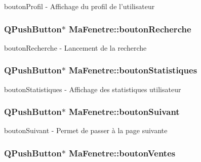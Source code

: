 bouton\-Profil -\/ Affichage du profil de l'utilisateur 

\hypertarget{class_ma_fenetre_afe6e47d40e487fccd18d4bcc3c57e64e}{
\subsubsection[{bouton\-Recherche}]{\setlength{\rightskip}{0pt plus 5cm}Q\-Push\-Button$\ast$ Ma\-Fenetre\-::bouton\-Recherche\hspace{0.3cm}{\ttfamily [protected]}}}\label{class_ma_fenetre_afe6e47d40e487fccd18d4bcc3c57e64e}


bouton\-Recherche -\/ Lancement de la recherche 

\hypertarget{class_ma_fenetre_ac438e7ad115265305422aadd11a04b50}{
\subsubsection[{bouton\-Statistiques}]{\setlength{\rightskip}{0pt plus 5cm}Q\-Push\-Button$\ast$ Ma\-Fenetre\-::bouton\-Statistiques\hspace{0.3cm}{\ttfamily [protected]}}}\label{class_ma_fenetre_ac438e7ad115265305422aadd11a04b50}


bouton\-Statistiques -\/ Affichage des statistiques utilisateur 

\hypertarget{class_ma_fenetre_a54110f455a71febc15224b68470dd80e}{
\subsubsection[{bouton\-Suivant}]{\setlength{\rightskip}{0pt plus 5cm}Q\-Push\-Button$\ast$ Ma\-Fenetre\-::bouton\-Suivant\hspace{0.3cm}{\ttfamily [protected]}}}\label{class_ma_fenetre_a54110f455a71febc15224b68470dd80e}


bouton\-Suivant -\/ Permet de passer à la page suivante 

\hypertarget{class_ma_fenetre_a9399bb35a8e0a832597a2f3cb4e8dea3}{
\subsubsection[{bouton\-Ventes}]{\setlength{\rightskip}{0pt plus 5cm}Q\-Push\-Button$\ast$ Ma\-Fenetre\-::bouton\-Ventes\hspace{0.3cm}{\ttfamily [protected]}}}\label{class_ma_fenetre_a9399bb35a8e0a832597a2f3cb4e8dea3}


